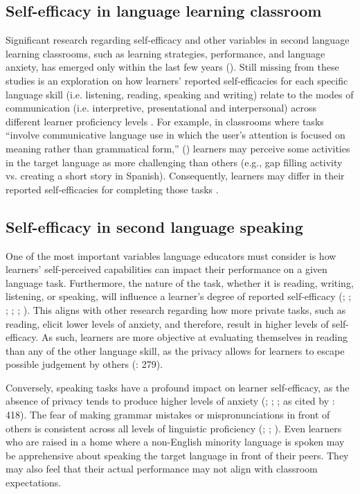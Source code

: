 \documentclass[output=paper]{langscibook}
\begin{document}
\subsection{{Self-efficacy in language learning classroom}}

Significant research regarding self-efficacy and other variables in second language learning classrooms, such as learning strategies, performance, and language anxiety, has emerged only within the last few years (\citealt[61]{RaoofiChan2012}). Still missing from these studies is an exploration on how learners’ reported self-efficacies for each specific language skill (i.e. listening, reading, speaking and writing) relate to the modes of communication (i.e. interpretive, presentational and interpersonal) across different learner proficiency levels \citep{TorresTurner2016}. For example, in classrooms where tasks “involve communicative language use in which the user’s attention is focused on meaning rather than grammatical form,” (\citealt[4]{Nunan2004}) learners may perceive some activities in the target language as more challenging than others (e.g., gap filling activity vs. creating a short story in Spanish). Consequently, learners may differ in their reported self-efficacies for completing those tasks \citep{TorresTurner2016}.

\subsection{{Self-efficacy in second language speaking}}

One of the most important variables language educators must consider is how learners’ self-perceived capabilities can impact their performance on a given language task. Furthermore, the nature of the task, whether it is reading, writing, listening, or speaking, will influence a learner’s degree of reported self-efficacy (\citealt{DewaeleFurnham2008}; \citealt{Horwitz2001}; \citealt{Kim2009}; \citealt{MacIntyreClément1997}; \citealt{Phillips1992}; \citealt{RaoofiChan2012}). This aligns with other research regarding how more private tasks, such as reading, elicit lower levels of anxiety, and therefore, result in higher levels of self-efficacy. As such, learners are more objective at evaluating themselves in reading than any of the other language skill, as the privacy allows for learners to escape possible judgement by others (\citealt{MacIntyreClément1997}: 279).

Conversely, speaking tasks have a profound impact on learner self-efficacy, as the absence of privacy tends to produce higher levels of anxiety (\citealt{Ellis1994}; \citealt{HorwitzCope1986}; \citealt{Young1991}; as cited by \citealt{ChengHorwitzSchallert1999}: 418). The fear of making grammar mistakes or mispronunciations in front of others is consistent across all levels of linguistic proficiency (\citealt{Aida1994}; \citealt{MacIntyreClément1997}; \citealt{Phillips1992}). Even learners who are raised in a home where a non-English minority language is spoken may be apprehensive about speaking the target language in front of their peers. They may also feel that their actual performance may not align with classroom expectations.
\end{document}
